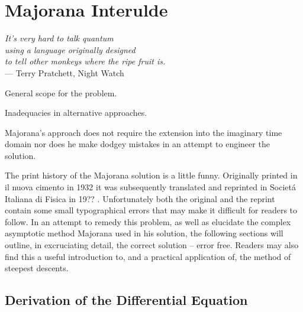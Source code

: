 
\chapter{Majorana Interulde} %

\label{ch:majinter} %


\begin{flushright}{\slshape    
It's very hard to talk quantum\\
using a language originally designed\\
 to tell other monkeys where the ripe fruit is.} \\ \medskip
--- Terry Pratchett, Night Watch
\end{flushright}

\bigskip


General scope for the problem.

Inadequacies in alternative approaches.

Majorana's approach does not require the extension into the imaginary time domain nor does he make dodgey mistakes in an attempt to engineer the solution.

The print history of the Majorana solution is a little funny.
Originally printed in il nuova cimento in 1932 \cite{?} it was subsequently translated and reprinted in Societ\'a Italiana di Fisica in 19?? \cite{?}.
Unfortunately both the original and the reprint contain some small typographical errors that may make it difficult for readers to follow.
In an attempt to remedy this problem, as well as elucidate the complex asymptotic method Majorana used in his solution, the following sections will outline, in excruciating detail, the correct solution -- error free.
Readers may also find this a useful introduction to, and a practical application of, the method of steepest descents.


\section{Derivation of the Differential Equation}

